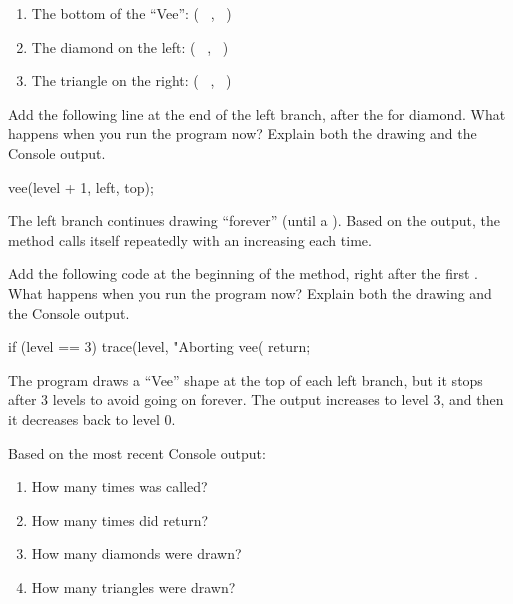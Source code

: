 \setlength{\defaultwidth}{4em}

\begin{enumerate}
\item The bottom of the ``Vee'': ( ~,  ~)
\item The diamond on the left:   ( ~,  ~)
\item The triangle on the right: ( ~,  ~)
\end{enumerate}


\Q Add the following line at the end of the left branch, after the  for diamond.
What happens when you run the program now?
Explain both the drawing and the Console output.

\begin{javalst}
vee(level + 1, left, top);
\end{javalst}

\begin{answer}[5em]
The left branch continues drawing ``forever'' (until a ).
Based on the output, the  method calls itself repeatedly with an increasing  each time.
\end{answer}


\newpage

\Q Add the following code at the beginning of the method, right after the first .
What happens when you run the program now?
Explain both the drawing and the Console output.

\begin{javalst}
if (level == 3) {
    trace(level, "Aborting vee(%
    return;
}
\end{javalst}

\begin{answer}[5em]
The program draws a ``Vee'' shape at the top of each left branch, but it stops after 3 levels to avoid going on forever.
The output increases to level 3, and then it decreases back to level 0.
\end{answer}


\Q Based on the most recent Console output:

\setlength{\defaultwidth}{1.5em}

\begin{multicols}{2}
\begin{enumerate}
\item How many times was  called? 
\item How many times did  return? 
\item How many diamonds were drawn? 
\item How many triangles were drawn? 
\end{enumerate}
\end{multicols}


